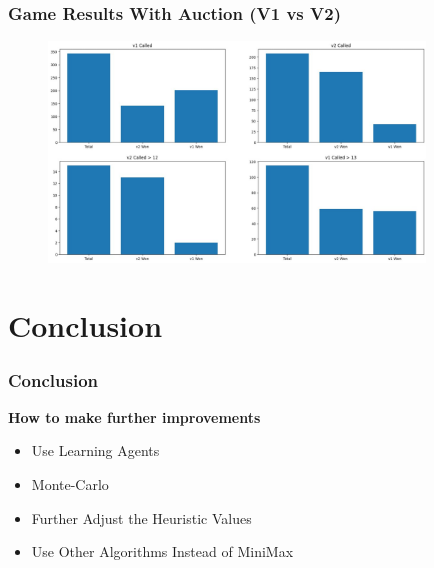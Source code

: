 \documentclass{beamer}
\begin{document}
\begin{frame}\frametitle{Game Results With Auction (V1 vs V2)}
\begin{center}
        \begin{figure}
	    \includegraphics[width=10cm]{V1vsV2.png}
        \end{figure}
\end{center}
\end{frame}

\section{Conclusion}
\begin{frame}\frametitle{Conclusion}
    \begin{center}
        \textbf{How to make further improvements}
    \end{center}
    \begin{itemize}
        \item Use Learning Agents 
        \item Monte-Carlo
        \item Further Adjust the Heuristic Values 
        \item Use Other Algorithms Instead of MiniMax
    \end{itemize}
\end{frame}
\end{document}
